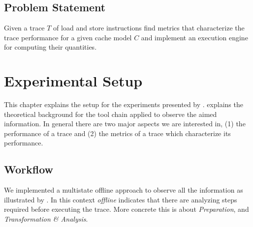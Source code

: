 \documentclass[onecolumn, openright, master, english, signatures]{dbrgrptt}
\begin{document}

\section{Problem Statement}
\begin{definition}
Given a \ac{trace} $T$ of load and store instructions find metrics that characterize the trace performance for a given cache model $C$ and implement an execution engine for computing their quantities.
\end{definition}


\chapter{Experimental Setup}\label{cha:experimental-setup}

This chapter explains the setup for the experiments presented by .  explains the theoretical background for the tool chain applied to observe the aimed information. In general there are two major aspects we are interested in, (1) the performance of a \ac{trace} and (2) the metrics of a \ac{trace} which characterize its performance.


\section{Workflow}

We implemented a multistate offline approach to observe all the information as illustrated by . In this context \emph{offline} indicates that there are analyzing steps required before executing the \ac{trace}. More concrete this is about \emph{Preparation}, and \emph{Transformation \& Analysis}.
\end{document}
